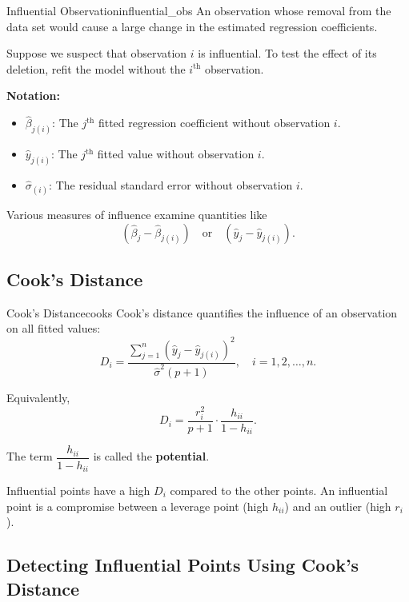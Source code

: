 \begin{defn}{Influential Observation}{influential_obs}
An observation whose removal from the data set would cause a large change in the estimated regression coefficients.
\end{defn}

Suppose we suspect that observation $i$ is influential. To test the effect of its deletion, refit the model without the $i^{\text{th}}$ observation.

\begin{notebox}
\textbf{Notation:}
\begin{itemize}
\item $\hat{\beta}_{j(i)}$: The $j^{\text{th}}$ fitted regression coefficient without observation $i$.
\item $\hat{y}_{j(i)}$: The $j^{\text{th}}$ fitted value without observation $i$.
\item $\hat{\sigma}_{(i)}$: The residual standard error without observation $i$.
\end{itemize}

Various measures of influence examine quantities like
\[
(\hat{\beta}_j - \hat{\beta}_{j(i)}) \quad \text{or} \quad (\hat{y}_j - \hat{y}_{j(i)}).
\]
\end{notebox}

\subsection{Cook's Distance}

\begin{defn}{Cook's Distance}{cooks}
Cook's distance quantifies the influence of an observation on all fitted values:
\[
D_i = \frac{\sum_{j=1}^{n} \left( \hat{y}_j - \hat{y}_{j(i)} \right)^2}{\hat{\sigma}^2 (p+1)},
\quad i = 1,2,\dots,n.
\]
\end{defn}

Equivalently,
\[
D_i = \frac{r_i^2}{p+1} \cdot \frac{h_{ii}}{1 - h_{ii}}.
\]

The term $\dfrac{h_{ii}}{1 - h_{ii}}$ is called the \textbf{potential}.

\begin{keyresult}
Influential points have a high $D_i$ compared to the other points. An influential point is a compromise between a leverage point (high $h_{ii}$) and an outlier (high $r_i$).
\end{keyresult}

\subsection{Detecting Influential Points Using Cook's Distance}


